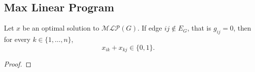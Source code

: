 \subsection{Max Linear Program}

\begin{conjecture} \label{conjecture::two_edge_path_maximization}
  Let $x$ be an optimal solution to $\mathcal{MLP}(G)$. If edge $ij \notin E_G$, that is $g_{ij}=0$, then for every $k\in\{1,\dots,n\}$,
  \[
  x_{ik}+x_{kj} \in \{0,1\}.
  \]
\end{conjecture}
\begin{proof}
  
\end{proof}
